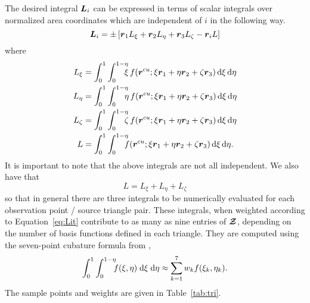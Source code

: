 The desired integral $\boldsymbol{L}_{i}$ can
be expressed in terms of scalar integrals over normalized area coordinates 
which are independent of $i$ in the
following way.
\begin{equation}
  \boldsymbol{L}_{i} = \pm  \left[
    \boldsymbol{r}_1 L_{\xi} + \boldsymbol{r}_2 L_{\eta} + \boldsymbol{r}_3 L_{\zeta}
    - \boldsymbol{r}_i L
  \right]    \label{eq:Lit}
\end{equation}
where
\begin{subequations}
  \begin{align}
    L_{\xi} &= \int_0^1 \int_0^{1-\eta}  \!\!\!\!
    \xi \, f(\rcu;\xi\r_1 + \eta\r_2 + \zeta\r_3)
    \, \d\xi \, \d\eta   \\
    L_{\eta} &= \int_0^1 \int_0^{1-\eta}  \!\!\!\!
    \eta \, f(\r^{cu};\xi\r_1 + \eta\r_2 + \zeta\r_3)
    \, \d\xi \, \d\eta   \\
    L_{\zeta} &= \int_0^1 \int_0^{1-\eta}  \!\!\!\!
    \zeta \, f(\r^{cu};\xi\r_1 + \eta\r_2 + \zeta\r_3)
    \, \d\xi \, \d\eta   \\
    L &=  \int_0^1 \int_0^{1-\eta}  \!\!\!\!
    f(\r^{cu};\xi\r_1 + \eta\r_2 + \zeta\r_3)
    \, \d\xi \, \d\eta.   \label{eq:L}
  \end{align}
\end{subequations}
It is important to note
that the above integrals are not all independent.  We also have that
\begin{equation}
  L = L_{\xi} + L_{\eta} + L_{\zeta}
\end{equation}
so that in general there are three integrals to be numerically evaluated for
each observation point / source triangle pair.  These integrals,
when weighted according to Equation~\eqref{eq:Lit} contribute
to as many as nine entries of $\boldsymbol{\mathcal{Z}}$, depending on the number of basis 
functions defined in each triangle.  They are computed using the seven-point
cubature formula from \cite{zien:71},
\begin{equation}
    \int_0^1 \int_0^{1-\eta} \!\!\!
  f(\xi, \eta) \; \text{d}\xi \; \text{d}\eta \approx \sum_{k=1}^7 w_k f(\xi_k, \eta_k).
  \label{eq:cubtri}
\end{equation}
The sample points and weights are given in Table~\ref{tab:tri}.

